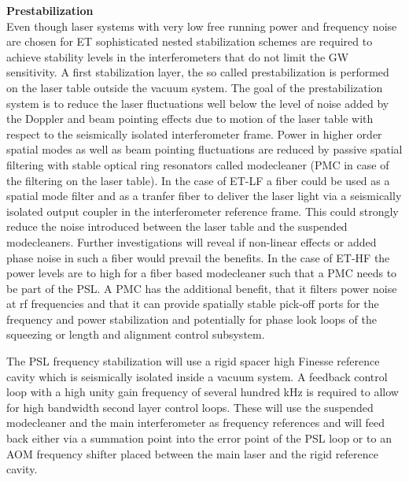{\bf Prestabilization}\\
Even though laser systems with very low free running power and frequency noise
are chosen for ET sophisticated nested stabilization schemes are required to
achieve stability levels in the interferometers that do not limit the GW
sensitivity. A first stabilization layer, the so called prestabilization is
performed on the laser table outside the vacuum system. The goal of the
prestabilization system is to reduce the laser fluctuations well below the level
of noise added by the Doppler and beam pointing effects due to motion of the
laser table with respect to the seismically isolated interferometer frame.
Power in higher order spatial modes as well as beam pointing fluctuations are
reduced by passive spatial filtering with stable optical ring resonators called
modecleaner (PMC in case of the filtering on the laser table).  In the case of
ET-LF a fiber could be used as a spatial mode filter and as a tranfer fiber to
deliver the laser light via a seismically isolated output coupler in the
interferometer reference frame. This could strongly reduce the noise introduced
between the laser table and the suspended modecleaners. Further investigations
will reveal if non-linear effects or added phase noise in such a fiber would
prevail the benefits. In the case of ET-HF the power levels are to high for a
fiber based modecleaner such that a PMC needs to be part of the PSL. A PMC has
the additional benefit, that it filters power noise at rf frequencies and that
it can provide spatially stable pick-off ports for the frequency and power
stabilization and potentially for phase look loops of the squeezing or length
and alignment control subsystem.

The PSL frequency stabilization will use a rigid spacer high Finesse reference
cavity which is seismically isolated inside a vacuum system. A feedback control
loop with a high unity gain frequency of several hundred kHz is required to
allow for high bandwidth second layer control loops. These will use the
suspended modecleaner and the main interferometer as frequency references and
will feed back either via a summation point into the error point of the PSL loop
or to an AOM frequency shifter placed between the main laser and the rigid
reference cavity.

